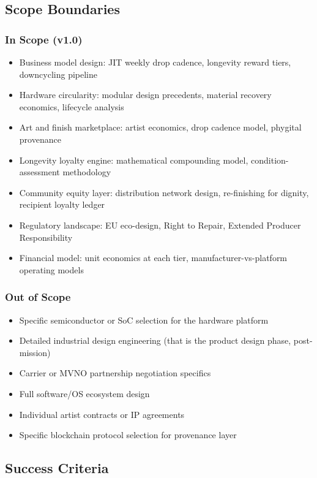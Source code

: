 \documentclass[11pt,letterpaper]{article}
\begin{document}
\subsection{Scope Boundaries}

\subsubsection{In Scope (v1.0)}
\begin{itemize}[noitemsep]
  \item Business model design: JIT weekly drop cadence, longevity reward tiers, downcycling pipeline
  \item Hardware circularity: modular design precedents, material recovery economics, lifecycle analysis
  \item Art and finish marketplace: artist economics, drop cadence model, phygital provenance
  \item Longevity loyalty engine: mathematical compounding model, condition-assessment methodology
  \item Community equity layer: distribution network design, re-finishing for dignity, recipient loyalty ledger
  \item Regulatory landscape: EU eco-design, Right to Repair, Extended Producer Responsibility
  \item Financial model: unit economics at each tier, manufacturer-vs-platform operating models
\end{itemize}

\subsubsection{Out of Scope}
\begin{itemize}[noitemsep]
  \item Specific semiconductor or SoC selection for the hardware platform
  \item Detailed industrial design engineering (that is the product design phase, post-mission)
  \item Carrier or MVNO partnership negotiation specifics
  \item Full software/OS ecosystem design
  \item Individual artist contracts or IP agreements
  \item Specific blockchain protocol selection for provenance layer
\end{itemize}

\subsection{Success Criteria}
\end{document}
